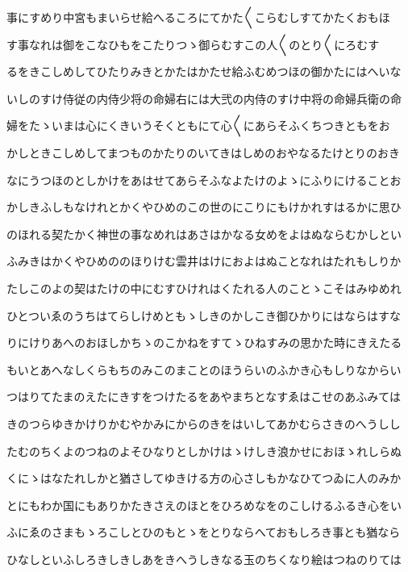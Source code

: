 \documentclass[a4paper,11pt,landscape]{ltjtarticle}
\begin{document}
\par\medskip
事にすめり中宮もまいらせ給へるころにてかた〱こらむしすてかたくおもほ
\par\medskip
す事なれは御をこなひもをこたりつゝ御らむすこの人〱のとり〱にろむす
\par\medskip
るをきこしめしてひたりみきとかたはかたせ給ふむめつほの御かたにはへいな
\par\medskip
いしのすけ侍従の内侍少将の命婦右には大弐の内侍のすけ中将の命婦兵衛の命
\par\medskip
婦をたゝいまは心にくきいうそくともにて心〱にあらそふくちつきともをお
\par\medskip
かしときこしめしてまつものかたりのいてきはしめのおやなるたけとりのおき
\par\medskip
なにうつほのとしかけをあはせてあらそふなよたけのよゝにふりにけることお
\par\medskip
かしきふしもなけれとかくやひめのこの世のにこりにもけかれすはるかに思ひ
\par\medskip
のほれる契たかく神世の事なめれはあさはかなる女めをよはぬならむかしとい
\par\medskip
ふみきはかくやひめののほりけむ雲井はけにおよはぬことなれはたれもしりか
\par\medskip
たしこのよの契はたけの中にむすひけれはくたれる人のことゝこそはみゆめれ
\par\medskip
ひとついゑのうちはてらしけめともゝしきのかしこき御ひかりにはならはすな
\par\medskip
りにけりあへのおほしかちゝのこかねをすてゝひねすみの思かた時にきえたる
\par\medskip
もいとあへなしくらもちのみこのまことのほうらいのふかき心もしりなからい
\par\medskip
つはりてたまのえたにきすをつけたるをあやまちとなすゑはこせのあふみては
\par\medskip
きのつらゆきかけりかむやかみにからのきをはいしてあかむらさきのへうしし
\par\medskip
たむのちくよのつねのよそひなりとしかけはゝけしき浪かせにおほゝれしらぬ
\par\medskip
くにゝはなたれしかと猶さしてゆきける方の心さしもかなひてつゐに人のみか
\par\medskip
とにもわか国にもありかたきさえのほとをひろめなをのこしけるふるき心をい
\par\medskip
ふにゑのさまもゝろこしとひのもとゝをとりならへておもしろき事とも猶なら
\par\medskip
ひなしといふしろきしきしあをきへうしきなる玉のちくなり絵はつねのりては
\par\medskip
\end{document}
